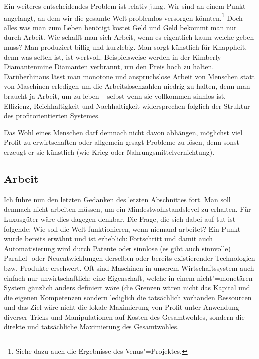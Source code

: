 Ein weiteres entscheidendes Problem ist relativ jung. Wir sind an einem Punkt angelangt, an dem wir die gesamte Welt problemlos versorgen könnten.\footnote{Siehe dazu auch die Ergebnisse des Venus"=Projektes.} Doch alles was man zum Leben benötigt kostet Geld und Geld bekommt man nur durch Arbeit. Wie schafft man sich Arbeit, wenn es eigentlich kaum welche geben muss? Man produziert billig und kurzlebig. Man sorgt künstlich für Knappheit, denn was selten ist, ist wertvoll. Beispielsweise werden in der Kimberly Diamantenmine Diamanten verbrannt, um den Preis hoch zu halten. Darüberhinaus lässt man monotone und anspruchslose Arbeit von Menschen statt von Maschinen erledigen um die Arbeitslosenzahlen niedrig zu halten, denn man braucht ja Arbeit, um zu leben -- selbst wenn sie vollkommen sinnlos ist. Effizienz, Reichhaltigkeit und Nachhaltigkeit widersprechen folglich der Struktur des profitorientierten Systemes.

Das Wohl eines Menschen darf demnach nicht davon abhängen, möglichst viel Profit zu erwirtschaften oder allgemein gesagt Probleme zu lösen, denn sonst erzeugt er sie künstlich (wie Krieg oder Nahrungsmittelvernichtung).

\subsection{Arbeit}\label{sec:situation/work}

Ich führe nun den letzten Gedanken des letzten Abschnittes fort. Man soll demnach nicht arbeiten müssen, um ein Mindestwohlstandslevel zu erhalten. Für Luxusgüter wäre dies dagegen denkbar. Die Frage, die sich dabei auf tut ist folgende: Wie soll die Welt funktionieren, wenn niemand arbeitet? Ein Punkt wurde bereits erwähnt und ist erheblich: Fortschritt und damit auch Automatisierung wird durch Patente oder sinnlose (es gibt auch sinnvolle) Parallel- oder Neuentwicklungen derselben oder bereits existierender Technologien bzw. Produkte erschwert. Oft sind Maschinen in unserem Wirtschaftssystem auch einfach nur unwirtschaftlich; eine Eigenschaft, welche in einem nicht"=monetären System gänzlich anders definiert wäre (die Grenzen wären nicht das Kapital und die eigenen Kompetenzen sondern lediglich die tatsächlich vorhanden Ressourcen und das Ziel wäre nicht die lokale Maximierung von Profit unter Anwendung diverser Tricks und Manipulationen auf Kosten des Gesamtwohles, sondern die direkte und tatsächliche Maximierung des Gesamtwohles.

